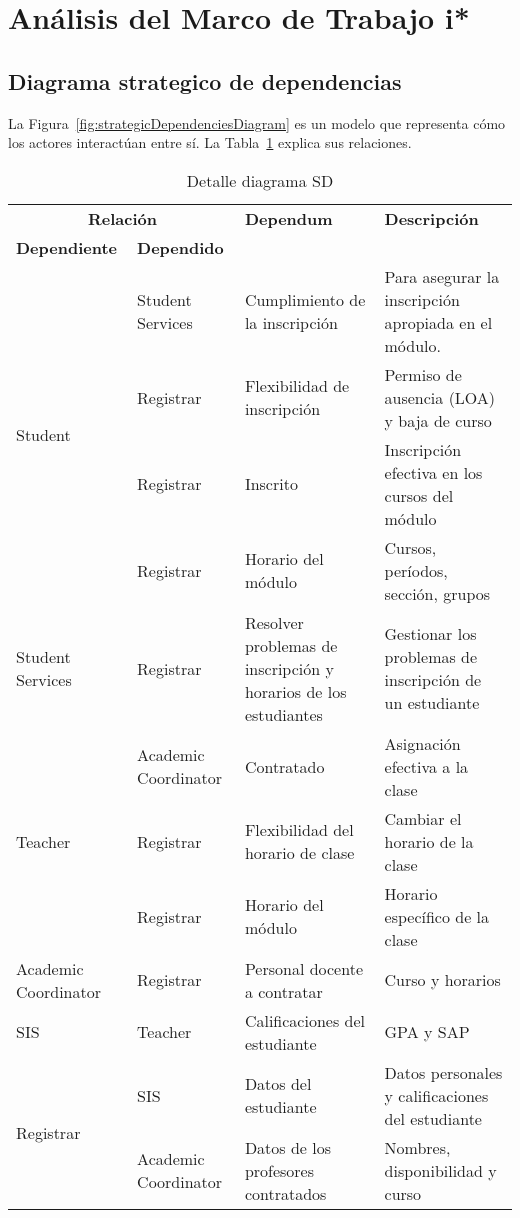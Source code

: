 \section{Análisis del Marco de Trabajo i*}
\label{sec:appendixIStarAnalysis}

\subsection*{Diagrama strategico de dependencias}
La Figura~\ref{fig:strategicDependenciesDiagram} es un modelo que representa cómo los actores interactúan entre sí.
La Tabla~\ref{tab:strategicDependencies} explica sus relaciones.
\begin{table}
\centering
\caption{Detalle diagrama SD} \label{tab:strategicDependencies}
	\begin{tabularx}{\linewidth}{@{} p{0.8in} p{1.2in} p{1.6in} X @{}}
	\toprule
	\multicolumn{2}{c}{\textbf{Relación}} & \textbf{Dependum} & \textbf{Descripción} \\
	\cmidrule(lr){1-2}
	\textbf{Dependiente} & \textbf{Dependido} & & \\
	\midrule
	\multirow{4}{*}{Student} & Student Services & Cumplimiento de la inscripción & Para asegurar la inscripción apropiada en el módulo. \\
	& Registrar & Flexibilidad de inscripción & Permiso de ausencia (LOA) y baja de curso \\
	& Registrar & Inscrito & Inscripción efectiva en los cursos del módulo \\
	& Registrar & Horario del módulo & Cursos, períodos, sección, grupos \\
	\hline
	Student Services & Registrar & Resolver problemas de inscripción y horarios de los estudiantes & Gestionar los problemas de inscripción de un estudiante\\
	\hline
	\multirow{3}{*}{Teacher} & Academic Coordinator & Contratado & Asignación efectiva a la clase \\
	& Registrar & Flexibilidad del horario de clase & Cambiar el horario de la clase \\
	& Registrar & Horario del módulo & Horario específico de la clase \\
	\hline
	Academic Coordinator & Registrar & Personal docente a contratar & Curso y horarios \\
	\hline
	SIS & Teacher & Calificaciones del estudiante & GPA y SAP\\
	\hline
	\multirow{2}{*}{Registrar} & SIS & Datos del estudiante & Datos personales y calificaciones del estudiante\\
	& Academic Coordinator & Datos de los profesores contratados & Nombres, disponibilidad y curso\\
	\bottomrule
	\end{tabularx}
\end{table}

